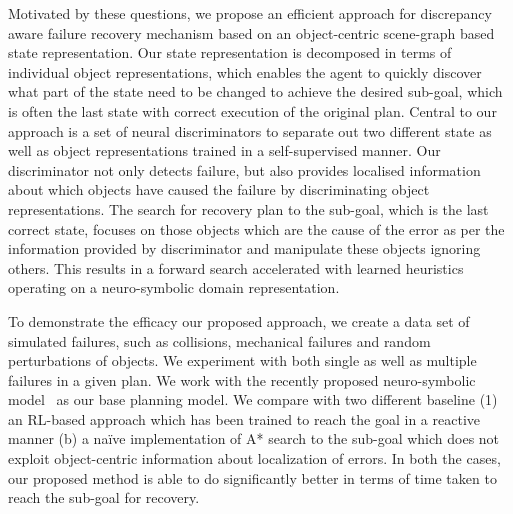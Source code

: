 Motivated by these questions, we propose an efficient approach for discrepancy aware failure recovery mechanism based on an object-centric scene-graph based state representation. Our state representation is decomposed in terms of individual object representations, which enables the agent to quickly discover what part of the state need to be changed to achieve the desired sub-goal, which is often the last state with correct execution of the original plan. Central to our approach is a set of neural discriminators to separate out two different state as well as object representations trained in a self-supervised manner. Our discriminator not only detects failure, but also provides localised information about which objects have caused the failure by discriminating object representations. The search for recovery plan to the sub-goal, which is the last correct state, focuses on those objects which are the cause of the error as per the information provided by discriminator and manipulate these objects ignoring others. This results in a forward search accelerated with learned heuristics operating on a neuro-symbolic domain representation. 
 
To demonstrate the efficacy our proposed approach, we create a data set of simulated failures, such as collisions, mechanical failures and random perturbations of objects. We experiment with both single as well as multiple failures in a given plan. We work with the recently proposed neuro-symbolic model~\cite{Kalithasan2022LearningNP} as our base planning model. We compare with two different baseline (1) an RL-based approach which has been trained to reach the goal in a reactive manner (b) a na\"{i}ve implementation of A* search to the sub-goal which does not exploit object-centric information about localization of errors. In both the cases, our proposed method is able to do significantly better in terms of time taken to reach the sub-goal for recovery.

